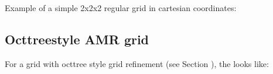 \documentclass[letterpaper,10pt,english]{sphinxmanual}
\begin{document}
Example of a simple 2x2x2 regular grid in cartesian coordinates:

\begin{sphinxVerbatim}[commandchars=\\\{\}]
    
    
   
   
   
\end{sphinxVerbatim}


\subsection{Oct\sphinxhyphen{}tree\sphinxhyphen{}style AMR grid}
\label{\detokenize{inputoutputfiles:oct-tree-style-amr-grid}}\label{\detokenize{inputoutputfiles:sec-amr-grid-oct-tree}}
For a grid with oct\sphinxhyphen{}tree style grid refinement (see Section
{\hyperref[\detokenize{gridding:sec-oct-tree-amr}]{}}), the  looks like:
\end{document}
